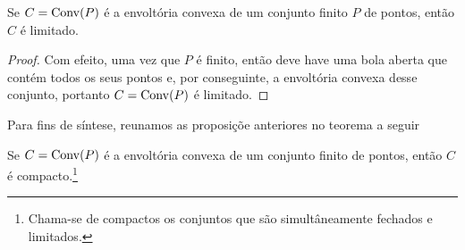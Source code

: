 \begin{prop:conjuntos convexos limitados}
  Se $C = \mathrm{Conv}(P)$ é a envoltória convexa de um conjunto finito $P$ de pontos,
  então $C$ é limitado.

  \begin{proof}
   Com efeito, uma vez que $P$ é finito, então deve have uma bola aberta que
   contém todos os seus pontos e, por conseguinte, a envoltória convexa desse
   conjunto, portanto $C = \mathrm{Conv}(P)$ é limitado.
  \end{proof}
\end{prop:conjuntos convexos limitados}

Para fins de síntese, reunamos as proposiçõe anteriores no teorema a seguir

\begin{thm:conjuntos convexos compactos}
  Se $C = \mathrm{Conv}(P)$ é a envoltória convexa de um conjunto finito de pontos,
  então $C$ é compacto.\footnote{Chama-se de compactos os conjuntos que são
  simultâneamente fechados e limitados.}
\end{thm:conjuntos convexos compactos}
